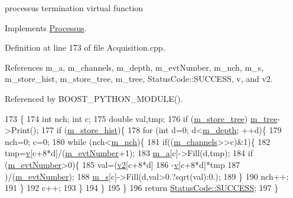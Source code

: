 processus termination virtual function 

Implements \hyperlink{classProcessus_aba93d691f031bdb18ae4b8afb1b2e856}{Processus}.



Definition at line 173 of file Acquisition.\+cpp.



References m\+\_\+a, m\+\_\+channels, m\+\_\+depth, m\+\_\+evt\+Number, m\+\_\+nch, m\+\_\+s, m\+\_\+store\+\_\+hist, m\+\_\+store\+\_\+tree, m\+\_\+tree, Status\+Code\+::\+S\+U\+C\+C\+E\+SS, v, and v2.



Referenced by B\+O\+O\+S\+T\+\_\+\+P\+Y\+T\+H\+O\+N\+\_\+\+M\+O\+D\+U\+L\+E().


\begin{DoxyCode}
173                                    \{
174   \textcolor{keywordtype}{int} nch; \textcolor{keywordtype}{int} c;
175   \textcolor{keywordtype}{double} val,tmp;
176   \textcolor{keywordflow}{if} (\hyperlink{classAcquisition_aca2143e9135e25554e58327475a767c5}{m\_store\_tree}) \hyperlink{classAcquisition_aa88a923232e8b7e08f5c1b5411497fc5}{m\_tree}->Print();
177   \textcolor{keywordflow}{if} (\hyperlink{classAcquisition_a08f70edd83751dbdab4c8190dc4b9188}{m\_store\_hist})\{
178     \textcolor{keywordflow}{for} (\textcolor{keywordtype}{int} d=0; d<\hyperlink{classAcquisition_a26628424533a2dd74d24712a14637a72}{m\_depth}; ++d)\{
179       nch=0; c=0;
180       \textcolor{keywordflow}{while} (nch<\hyperlink{classAcquisition_a1860c7a03a65ea7a778d30dd4a40e1e1}{m\_nch})\{
181         \textcolor{keywordflow}{if}((\hyperlink{classAcquisition_aedc8b29f322ef00540797fbd0d5112d1}{m\_channels}>>c)&1)\{
182           tmp=\hyperlink{classAcquisition_ac855680c9bb5f8f14d505d5f41f1a076}{v}[c+8*d]/(\hyperlink{classAcquisition_a32a70daa3f653eae5eafc46dbd0e11a6}{m\_evtNumber}+1);
183           \hyperlink{classAcquisition_aedfd2a4842b08fdf85176bf672030430}{m\_a}[c]->Fill(d,tmp);
184           \textcolor{keywordflow}{if} (\hyperlink{classAcquisition_a32a70daa3f653eae5eafc46dbd0e11a6}{m\_evtNumber}>0)\{
185             val=(\hyperlink{classAcquisition_a8d2cd605d4982223356a14423d735c84}{v2}[c+8*d]
186                  -\hyperlink{classAcquisition_ac855680c9bb5f8f14d505d5f41f1a076}{v}[c+8*d]*tmp
187                  )/(\hyperlink{classAcquisition_a32a70daa3f653eae5eafc46dbd0e11a6}{m\_evtNumber});
188             \hyperlink{classAcquisition_ad7f531c3d3fc58d1a2a5eab954db0ca7}{m\_s}[c]->Fill(d,val>0.?sqrt(val):0.);
189           \}
190           nch++;
191         \}
192         c++;
193       \}
194     \}
195   \}
196   \textcolor{keywordflow}{return} \hyperlink{classStatusCode_a6f565cbeadc76d14c72f047e5e85eb4badd0da38d3ba0d922efd1f4619bc37ad8}{StatusCode::SUCCESS};
197 \}
\end{DoxyCode}
\mbox{\label{classProcessus_a409227db936baff03c0462c1bcfe8069}} 

